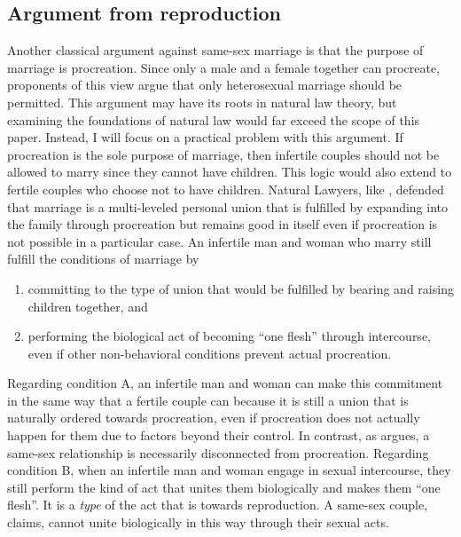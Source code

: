 \documentclass[man,floatsintext]{apa7}
\begin{document}
\subsection{Argument from reproduction}
\label{reproduction}

Another classical argument against same-sex marriage is that the purpose of marriage is procreation. Since only a male and a female together can procreate, proponents of this view argue that only heterosexual marriage should be permitted. This argument may have its roots in natural law theory, but examining the foundations of natural law would far exceed the scope of this paper. Instead, I will focus on a practical problem with this argument. If procreation is the sole purpose of marriage, then infertile couples should not be allowed to marry since they cannot have children. This logic would also extend to fertile couples who choose not to have children. Natural Lawyers, like \textcite{leeMarriageProcreationSameSex2008}, defended that marriage is a multi-leveled personal union that is fulfilled by expanding into the family through procreation but remains good in itself even if procreation is not possible in a particular case. An infertile man and woman who marry still fulfill the conditions of marriage by 

\begin{enumerate}
\item {committing to the type of union that would be fulfilled by bearing and raising children together, and}
\item {performing the biological act of becoming ``one flesh'' through intercourse, even if other non-behavioral conditions prevent actual procreation.}
\end{enumerate}

Regarding condition A, an infertile man and woman can make this commitment in the same way that a fertile couple can because it is still a union that is naturally ordered towards procreation, even if procreation does not actually happen for them due to factors beyond their control. In contrast, as  argues, a same-sex relationship is necessarily disconnected from procreation. Regarding condition B, when an infertile man and woman engage in sexual intercourse, they still perform the kind of act that unites them biologically and makes them ``one flesh''. It is a \textit{type} of the act that is towards reproduction. A same-sex couple,  claims, cannot unite biologically in this way through their sexual acts.
\end{document}
